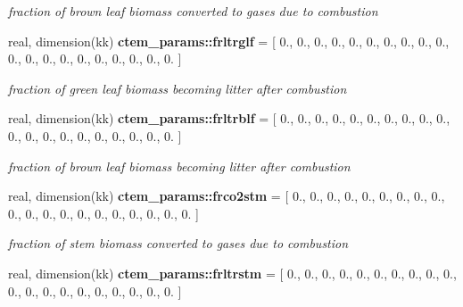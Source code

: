 \begin{DoxyCompactItemize}
\begin{DoxyCompactList}\small\item\em fraction of brown leaf biomass converted to gases due to combustion \end{DoxyCompactList}\item 
\hypertarget{namespacectem__params_ab9c6dc0514620728eecf50eb9c37892e}{}real, dimension(kk) {\bfseries ctem\+\_\+params\+::frltrglf} = \mbox{[} 0., 0., 0., 0., 0., 0., 0., 0., 0., 0., 0., 0., 0., 0., 0., 0., 0., 0., 0., 0. \mbox{]}\label{namespacectem__params_ab9c6dc0514620728eecf50eb9c37892e}

\begin{DoxyCompactList}\small\item\em fraction of green leaf biomass becoming litter after combustion \end{DoxyCompactList}\item 
\hypertarget{namespacectem__params_a665ceea7e9350e769153df8ce09859c9}{}real, dimension(kk) {\bfseries ctem\+\_\+params\+::frltrblf} = \mbox{[} 0., 0., 0., 0., 0., 0., 0., 0., 0., 0., 0., 0., 0., 0., 0., 0., 0., 0., 0., 0. \mbox{]}\label{namespacectem__params_a665ceea7e9350e769153df8ce09859c9}

\begin{DoxyCompactList}\small\item\em fraction of brown leaf biomass becoming litter after combustion \end{DoxyCompactList}\item 
\hypertarget{namespacectem__params_a16e61987713a7f1a1434ff33d5129cbe}{}real, dimension(kk) {\bfseries ctem\+\_\+params\+::frco2stm} = \mbox{[} 0., 0., 0., 0., 0., 0., 0., 0., 0., 0., 0., 0., 0., 0., 0., 0., 0., 0., 0., 0. \mbox{]}\label{namespacectem__params_a16e61987713a7f1a1434ff33d5129cbe}

\begin{DoxyCompactList}\small\item\em fraction of stem biomass converted to gases due to combustion \end{DoxyCompactList}\item 
\hypertarget{namespacectem__params_a9c2ccc3e7359b88d45fd61fdbf47900c}{}real, dimension(kk) {\bfseries ctem\+\_\+params\+::frltrstm} = \mbox{[} 0., 0., 0., 0., 0., 0., 0., 0., 0., 0., 0., 0., 0., 0., 0., 0., 0., 0., 0., 0. \mbox{]}\label{namespacectem__params_a9c2ccc3e7359b88d45fd61fdbf47900c}


\end{DoxyCompactItemize}
